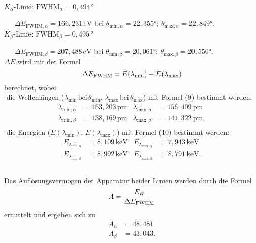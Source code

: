 \paragraph{}
$K_\alpha$-Linie: $\text{FWHM}_\alpha= 0,494 \,\mathrm{°}$ 

\,\,\,\,\,\,\,\,\,\(\Delta E_{\text{FWHM},\alpha}=166,231\,\mathrm{eV}\) bei \(\theta_{\text{min},\alpha}=22,355°\); \(\theta_{\text{max},\alpha}=22,849°\).\\

$K_\beta$-Linie: $\text{FWHM}_\beta= 0,495 \,\mathrm{°}$

\,\,\,\,\,\,\,\,\,\(\Delta E_{\text{FWHM},\beta}=207,488\,\mathrm{eV}\) bei \(\theta_{\text{min},\beta}=20,061°\); \(\theta_{\text{max},\beta}=20,556°\). \\ 

$\Delta E$ wird mit der Formel
\begin{equation}
    \Delta E_{\text{FWHM}} = E(\lambda_{\text{min}}) -E(\lambda_{\text{max}})\\
   \end{equation}
berechnet, wobei\\ 
-die Wellenlängen ($\lambda_{\text{min}}\, \text{bei}\, \theta_{\text{min}}$, $\lambda_{\text{max}}\, \text{bei}\, \theta_{\text{max}}$) mit Formel (9) bestimmt werden:
\begin{align*}
  \lambda_{\text{min},\alpha}&=153,203\,\mathrm{pm}  & \lambda_{\text{max},\alpha}&=156,409 \,\mathrm{pm} \\
  \lambda_{\text{min},\beta}&=138,169\,\mathrm{pm}  & \lambda_{\text{max},\beta}&=141,322\,\mathrm{pm}, \\
\end{align*}
-die Energien ($E(\lambda_{\text{min}})$, $E(\lambda_{\text{max}})$) mit Formel (10) bestimmt werden:
\begin{align*}
E_{\lambda_{\text{min},\alpha}}&=8,109\,\mathrm{keV} & E_{\lambda_{\text{max},\alpha}}&=7,943\,\mathrm{keV}\\
E_{\lambda_{\text{min},\beta}}&=8,992\,\mathrm{keV} & E_{\lambda_{\text{max},\beta}}&= 8,791\,\mathrm{keV}.\\
\end{align*}
\paragraph{}
Das Auflösungsvermögen der Apparatur beider Linien werden durch die Formel
\begin{equation}
    A = \frac{E_K}{\Delta E_{\text{FWHM}}}\\
   \end{equation}
ermittelt und ergeben sich zu
\begin{align*}
    A_\alpha &= 48,481\\
    A_\beta &= 43,043.\\
  \end{align*}

